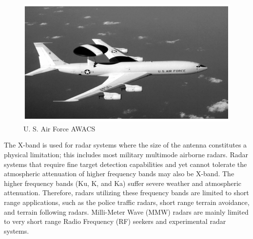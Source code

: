 \documentclass[14pt]{article} %
\begin{document}
 \begin{figure}[H]
  \includegraphics[width=\linewidth]{airforce.png}
  \caption{ U. S. Air Force AWACS}
  \label{fig:figure 9}
\end{figure}
The X-band is used for radar systems where the size of the antenna constitutes a physical limitation; this includes most military multimode airborne radars. Radar systems that require fine target detection capabilities and yet cannot tolerate the atmospheric attenuation of higher frequency bands may also be X-band. The higher frequency bands (Ku, K, and Ka) suffer severe weather and atmospheric attenuation. Therefore, radars utilizing these frequency bands are limited to short range applications, such as the police traffic radars, short range terrain avoidance, and terrain following radars. Milli-Meter Wave (MMW) radars are mainly limited to very short range Radio Frequency (RF) seekers and experimental radar systems.
\end{document}
